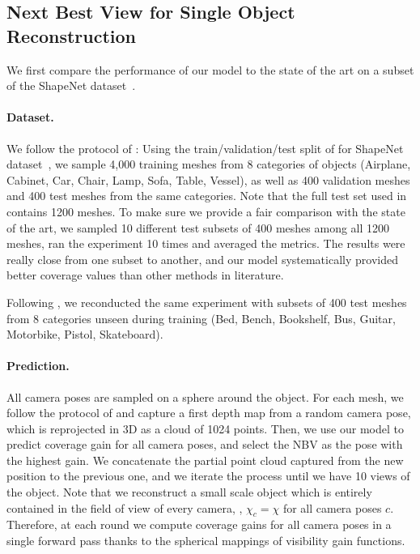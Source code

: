\subsection{Next Best View for Single Object Reconstruction}
\label{sec:supp_mat_single_object}

We first compare the performance of our model to the state of the art on a subset of the ShapeNet dataset~\cite{shapenet2015}.

\paragraph{Dataset.}
We follow the protocol of \cite{zeng-icirs20-pcnbv}: Using the train/validation/test split of \cite{yuan-corr18-pcn} for ShapeNet dataset~\cite{shapenet2015}, we sample 4,000 training meshes from 8 categories of objects (Airplane, Cabinet, Car, Chair, Lamp, Sofa, Table, Vessel), as well as 400 validation meshes and 400 test meshes from the same categories. Note that the full test set used in \cite{yuan-corr18-pcn} contains 1200 meshes. To make sure we provide a fair comparison with the state of the art, we sampled 10 different test subsets of 400 meshes among all 1200 meshes, ran the experiment 10 times and averaged the metrics. The results were really close from one subset to another, and our model systematically provided better coverage values than other methods in literature.%

Following \cite{zeng-icirs20-pcnbv}, we reconducted the same experiment with subsets of 400 test meshes from 8 categories unseen during training (Bed, Bench, Bookshelf, Bus, Guitar, Motorbike, Pistol, Skateboard). 

\paragraph{Prediction.}%
All camera poses are sampled on a sphere around the object. For each mesh, we follow the protocol of \cite{zeng-icirs20-pcnbv} and capture a first depth map from a random camera pose, which is reprojected in 3D as a cloud of 1024 points. Then, we use our model to predict coverage gain for all camera poses, and select the NBV as the pose with the highest gain. We concatenate the partial point cloud captured from the new position to the previous one, and we iterate the process until we have 10 views of the object. Note that we reconstruct a small scale object which is entirely contained in the field of view of every camera, \ie, $\chi_c=\chi$ for all camera poses $c$. %
Therefore, at each round we compute coverage gains for all camera poses in a single forward pass thanks to the spherical mappings of visibility gain functions.

